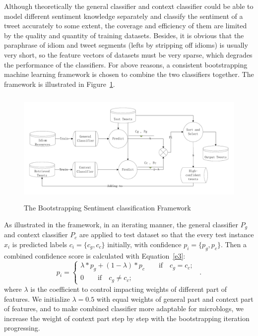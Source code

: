 \documentclass{llncs}
\begin{document}
Although theoretically the general classifier and context classifier could be able to model different sentiment knowledge separately and classify the sentiment of a tweet accurately to some extent, the coverage and efficiency of them are limited by the quality and quantity of training datasets. 
Besides, it is obvious that the paraphrase of idiom and tweet segments (lefts by stripping off idioms) is usually very short, so the feature vectors of datasets must be very sparse, which degrades the performance of the classifiers. 
For above reasons, a consistent bootstrapping machine learning framework is chosen to combine the two classifiers together. 
The framework is illustrated in Figure~\ref{fig1}. 
\begin{figure} 
\centering%
\includegraphics[width=5.0in,height=2.2in]{itse13p.pdf}
\caption{The Bootstrapping Sentiment classification Framework}
\label{fig1}
\end{figure}
As illustrated in the framework, in an iterating manner, the general classifier $ P_{g} $ and context classifier $ P_{c} $ are applied to test dataset so that the every test instance $ x_{i} $ is predicted labels $ c_{i}=\lbrace c_{g},c_{c}\rbrace $ initially, with confidence $ p_{i}= \lbrace p_{g},p_{c}\rbrace$. 
Then a combined confidence score is calculated with Equation~\ref{e3}:
\begin{equation}
\label{e3}
p_{i}=\left\{
\begin{array}{rcl}
\lambda\ast p_{g} + \left( 1-\lambda \right) \ast p_{c} \qquad \mbox{if} \quad c_{g}=c_{c};\\
0 \qquad \mbox{if} \quad c_{g} \neq c_{c};
\end{array}
\right. \enspace .
\end{equation}
where $ \lambda $ is the coefficient to control impacting weights of different part of features. 
We initialize $ \lambda = 0.5 $ with equal weights of general part and context part of features, and to make combined classifier more adaptable for microblogs, we  increase the weight of context part step by step with the bootstrapping iteration progressing.
\end{document}
